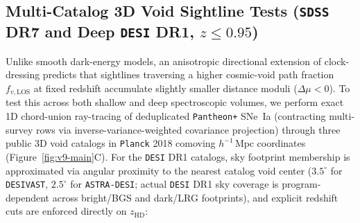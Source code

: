 \documentclass[11pt,a4paper]{article}
\begin{document}
\subsection{Multi-Catalog 3D Void Sightline Tests (\texttt{SDSS} DR7 and Deep \texttt{DESI} DR1, $z \le 0.95$)}
Unlike smooth dark-energy models, an anisotropic directional extension of clock-dressing predicts that sightlines traversing a higher cosmic-void path fraction $f_{v,\mathrm{LOS}}$ at fixed redshift accumulate slightly smaller distance moduli ($\Delta\mu < 0$). To test this across both shallow and deep spectroscopic volumes, we perform exact 1D chord-union ray-tracing of deduplicated \texttt{Pantheon+} SNe~Ia (contracting multi-survey rows via inverse-variance-weighted covariance projection) through three public 3D void catalogs in \texttt{Planck} 2018 comoving $h^{-1}\,\mathrm{Mpc}$ coordinates (Figure~\ref{fig:v9-main}C). For the \texttt{DESI} DR1 catalogs, sky footprint membership is approximated via angular proximity to the nearest catalog void center ($3.5^\circ$ for \texttt{DESIVAST}, $2.5^\circ$ for \texttt{ASTRA-DESI}; actual \texttt{DESI} DR1 sky coverage is program-dependent across bright/BGS and dark/LRG footprints), and explicit redshift cuts are enforced directly on $z_{\mathrm{HD}}$:
\end{document}
